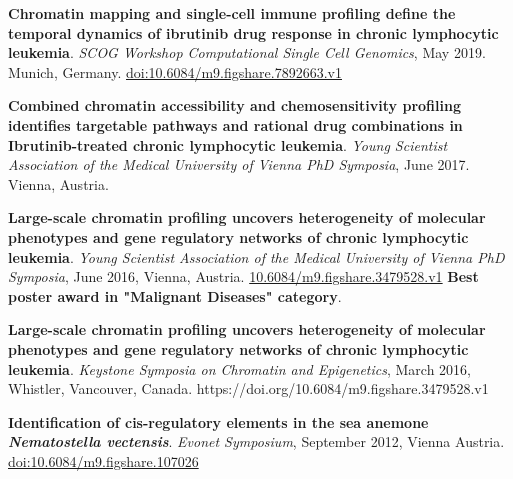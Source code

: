 \documentclass[11pt,a4paper,roman]{moderncv} %
\begin{document}
        \begin{etaremune}[leftmargin=1.0cm,itemindent=0pt,topsep=10pt,itemsep=2pt,partopsep=0pt,parsep=0pt]

        \item
        \textbf{Chromatin mapping and single-cell immune profiling define the temporal dynamics of ibrutinib drug response in chronic lymphocytic leukemia}. \textit{SCOG Workshop Computational Single Cell Genomics}, May 2019. Munich, Germany. \href{https://doi.org/10.6084/m9.figshare.7892663.v1}{doi:10.6084/m9.figshare.7892663.v1}
        \item
        \textbf{Combined chromatin accessibility and chemosensitivity profiling identifies targetable pathways and rational drug combinations in Ibrutinib-treated chronic lymphocytic leukemia}. \textit{Young Scientist Association of the Medical University of Vienna PhD Symposia}, June 2017. Vienna, Austria.
        \item
        \textbf{Large-scale chromatin profiling uncovers heterogeneity of molecular phenotypes and gene regulatory networks of chronic lymphocytic leukemia}. \textit{Young Scientist Association of the Medical University of Vienna PhD Symposia}, June 2016, Vienna, Austria. \href{https://doi.org/10.6084/m9.figshare.3479528.v1}{10.6084/m9.figshare.3479528.v1} \textbf{Best poster award in "Malignant Diseases" category}.
        \item
        \textbf{Large-scale chromatin profiling uncovers heterogeneity of molecular phenotypes and gene regulatory networks of chronic lymphocytic leukemia}. \textit{Keystone Symposia on Chromatin and Epigenetics}, March 2016, Whistler, Vancouver, Canada. https://doi.org/10.6084/m9.figshare.3479528.v1
        \item
        \textbf{Identification of cis-regulatory elements in the sea anemone \textit{Nematostella vectensis}}. \textit{Evonet Symposium}, September 2012, Vienna Austria. \href{https://doi.org/10.6084/m9.figshare.107026}{doi:10.6084/m9.figshare.107026}
        \end{etaremune}
\end{document}
